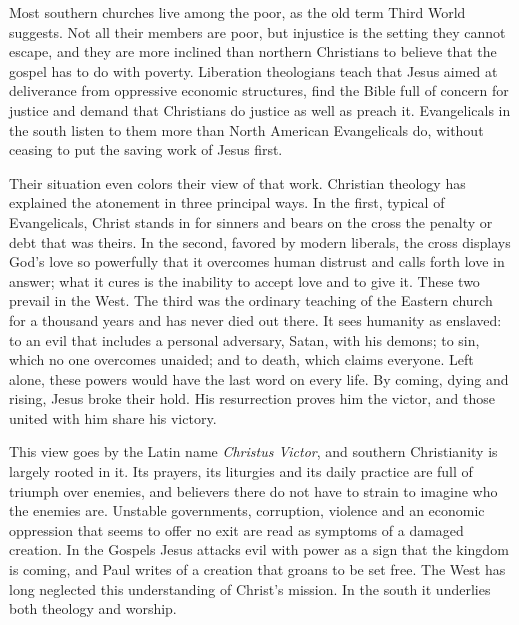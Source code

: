 Most southern churches live among the poor, as the old term Third World suggests. Not all their
members are poor, but injustice is the setting they cannot escape, and they are more inclined than
northern Christians to believe that the gospel has to do with poverty. Liberation theologians teach
that Jesus aimed at deliverance from oppressive economic structures, find the Bible full of concern
for justice and demand that Christians do justice as well as preach it. Evangelicals in the south
listen to them more than North American Evangelicals do, without ceasing to put the saving work of
Jesus first.

Their situation even colors their view of that work. Christian theology has explained the atonement
in three principal ways. In the first, typical of Evangelicals, Christ stands in for sinners and
bears on the cross the penalty or debt that was theirs. In the second, favored by modern liberals,
the cross displays God's love so powerfully that it overcomes human distrust and calls forth love in
answer; what it cures is the inability to accept love and to give it. These two prevail in the West.
The third was the ordinary teaching of the Eastern church for a thousand years and has never died
out there. It sees humanity as enslaved: to an evil that includes a personal adversary, Satan, with
his demons; to sin, which no one overcomes unaided; and to death, which claims everyone. Left alone,
these powers would have the last word on every life. By coming, dying and rising, Jesus broke their
hold. His resurrection proves him the victor, and those united with him share his victory.

This view goes by the Latin name \emph{Christus Victor}, and southern Christianity is largely rooted
in it. Its prayers, its liturgies and its daily practice are full of triumph over enemies, and
believers there do not have to strain to imagine who the enemies are. Unstable governments,
corruption, violence and an economic oppression that seems to offer no exit are read as symptoms of a
damaged creation. In the Gospels Jesus attacks evil with power as a sign that the kingdom is coming,
and Paul writes of a creation that groans to be set free. The West has long neglected this
understanding of Christ's mission. In the south it underlies both theology and worship.

